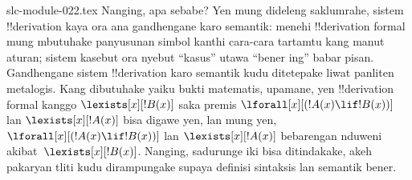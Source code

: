 \begin{filecontents*}[overwrite]{slc-module-022.tex}
Nanging, apa sebabe? Yen mung dideleng saklumrahe, sistem
!!{derivation} kaya ora ana gandhengane karo semantik: menehi
!!{derivation} formal mung mbutuhake panyusunan simbol kanthi cara-cara
tartamtu kang manut aturan; sistem kasebut ora nyebut ``kasus'' utawa
``bener ing'' babar pisan. Gandhengane sistem !!{derivation} karo
semantik kudu ditetepake liwat panliten metalogis. Kang dibutuhake yaiku
bukti matematis, upamane, yen !!{derivation} formal kanggo
$\lexists[x][!B(x)]$ saka premis $\lforall[x][(!A(x) \lif !B(x))]$ lan
$\lexists[x][!A(x)]$ bisa digawe yen, lan mung yen,
$\lforall[x][(!A(x) \lif !B(x))]$ lan $\lexists[x][!A(x)]$ bebarengan
nduweni akibat~$\lexists[x][!B(x)]$. Nanging, sadurunge iki
bisa ditindakake, akeh pakaryan tliti kudu dirampungake supaya definisi
sintaksis lan semantik bener.


\end{filecontents*}


